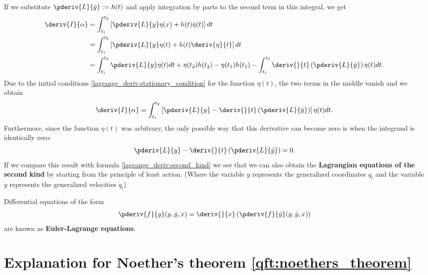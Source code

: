     If we substitute $\pderiv{L}{\dot{y}} := h(t)$ and apply integration by parts to the second term in this integral, we get
    \begin{align}
        \deriv{I}{\alpha}&=\int_{t_1}^{t_2}\left[\pderiv{L}{y}\eta(x) + h(t)\dot{\eta}(t)\right]dt\nonumber\\
        &=\int_{t_1}^{t_2}\left[\pderiv{L}{y}\eta(t) + h(t)\deriv{\eta}{t}\right]dt\nonumber\\
        &=\int_{t_1}^{t_2}\pderiv{L}{y}\eta(t)dt + \eta(t_2)h(t_2) - \eta(t_1)h(t_1) - \int_{t_1}^{t_2}\deriv{}{t}\left(\pderiv{L}{\dot{y}}\right)\eta(t)dt.
    \end{align}
    Due to the initial conditions \ref{lagrange_deriv:stationary_condition} for the function $\eta(t)$, the two terms in the middle vanish and we obtain
    \begin{gather}
        \label{lagrange_deriv:final_integral}
        \deriv{I}{\alpha}=\int_{t_1}^{t_2}\left[\pderiv{L}{y} - \deriv{}{t}\left(\pderiv{L}{\dot{y}}\right)\right]\eta(t)dt.
    \end{gather}
    Furthermore, since the function $\eta(t)$ was arbitrary, the only possible way that this derivative can become zero is when the integrand is identically zero:
    \begin{gather}
        \label{lagrange_deriv:second_kind_with_hamilton}
        \pderiv{L}{y} - \deriv{}{t}\left(\pderiv{L}{\dot{y}}\right) = 0.
    \end{gather}
    If we compare this result with formula \ref{lagrange_deriv:second_kind} we see that we can also obtain the \textbf{Lagrangian equations of the second kind} by starting from the principle of least action. (Where the variable $y$ represents the generalized coordinates $q_l$ and the variable $\dot{y}$ represents the generalized velocities $\dot{q}_l$)

    \begin{remark}
        Differential equations of the form
        \begin{gather}
            \label{lagrange_deriv:euler_lagrange_equation}
            \pderiv{f}{y}(y, \dot{y}, x) = \deriv{}{x}\left(\pderiv{f}{\dot{y}}(y, \dot{y}, x)\right)
        \end{gather}
        are known as \textbf{Euler-Lagrange equations}.
    \end{remark}

\section{Explanation for Noether's theorem \ref{qft:noethers_theorem}}\label{proof:noether}

